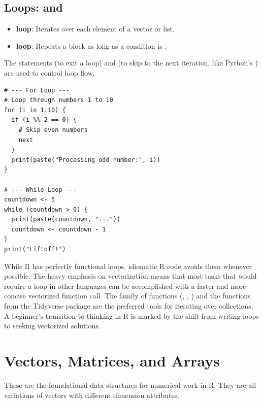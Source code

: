 \subsection*{Loops:  and }
\begin{itemize}
    \item \textbf{ loop}: Iterates over each element of a vector or list.
    \item \textbf{ loop}: Repeats a block as long as a condition is .
\end{itemize}
The statements  (to exit a loop) and  (to skip to the next iteration, like Python's ) are used to control loop flow.

\begin{example}[Looping in R]
\text{ }\begin{verbatim}
# --- For Loop ---
# Loop through numbers 1 to 10
for (i in 1:10) {
  if (i %% 2 == 0) {
    # Skip even numbers
    next
  }
  print(paste("Processing odd number:", i))
}

# --- While Loop ---
countdown <- 5
while (countdown > 0) {
  print(paste(countdown, "..."))
  countdown <- countdown - 1
}
print("Liftoff!")
\end{verbatim}
\end{example}

\begin{remark}
While R has perfectly functional loops, idiomatic R code avoids them whenever possible. The heavy emphasis on vectorization means that most tasks that would require a loop in other languages can be accomplished with a faster and more concise vectorized function call. The  family of functions (, , ) and the  functions from the Tidyverse package  are the preferred tools for iterating over collections. A beginner's transition to thinking in R is marked by the shift from writing  loops to seeking vectorized solutions.
\end{remark}

\section{Vectors, Matrices, and Arrays}
\label{sec:r_vectors_matrices_arrays}
These are the foundational data structures for numerical work in R. They are all variations of vectors with different dimension attributes.

